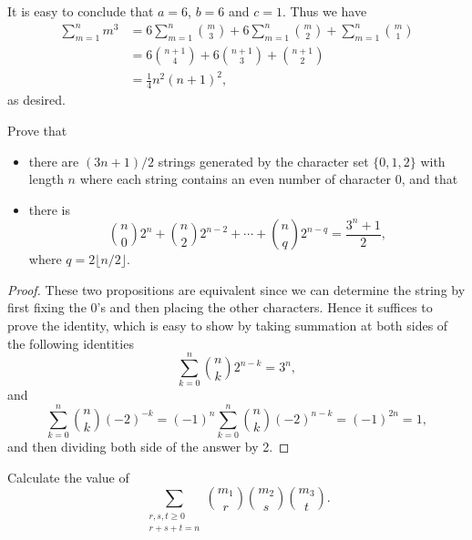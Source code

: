 \documentclass{assignment}[2019/10/15]
\begin{document}
    \begin{solution}
        It is easy to conclude that $a=6$, $b=6$ and $c=1$. Thus we have
        \begin{equation}
            \begin{aligned}
                \sum_{m=1}^{n}m^3
                &= 6\sum_{m=1}^n \binom{m}{3} + 6\sum_{m=1}^n \binom{m}{2} + \sum_{m=1}^n \binom{m}{1}\\
                &= 6\binom{n+1}{4} + 6\binom{n+1}{3} + \binom{n+1}{2}\\
                &= \frac{1}{4}n^2(n+1)^2,
            \end{aligned}
        \end{equation}
        as desired.
    \end{solution}
    \begin{problem}
        Prove that
        \begin{itemize}
            \item there are $(3n+1)/2$ strings generated by the character set $\{0, 1, 2\}$ with length $n$ where each string contains an even number of character 0, and that
            \item there is
                \begin{equation}
                    \binom n0 2^n + \binom n2 2^{n-2}+\dotsb + \binom nq 2^{n-q}=\frac{3^n+1}{2},
                \end{equation}
                where $q=2\lfloor n/2\rfloor$.
        \end{itemize}
    \end{problem}
    \begin{proof}
        These two propositions are equivalent since we can determine the string by first fixing the 0's and then placing the other characters. Hence it suffices to prove the identity, which is easy to show by taking summation at both sides of the following identities
        \begin{equation}
            \sum_{k=0}^n \binom nk 2^{n-k} = 3^n,
        \end{equation}
        and
        \begin{equation}
            \sum_{k=0}^n \binom nk (-2)^{-k} = (-1)^n\sum_{k=0}^n \binom nk (-2)^{n-k} = (-1)^{2n}=1,
        \end{equation}
        and then dividing both side of the answer by 2.
    \end{proof}
    \begin{problem}
        Calculate the value of
        \begin{equation}
            \sum_{\substack{r,s,t\geq 0\\ r+s+t=n}}\binom{m_1}{r} \binom {m_2}s \binom {m_3}t.
        \end{equation}
    \end{problem}
\end{document}

